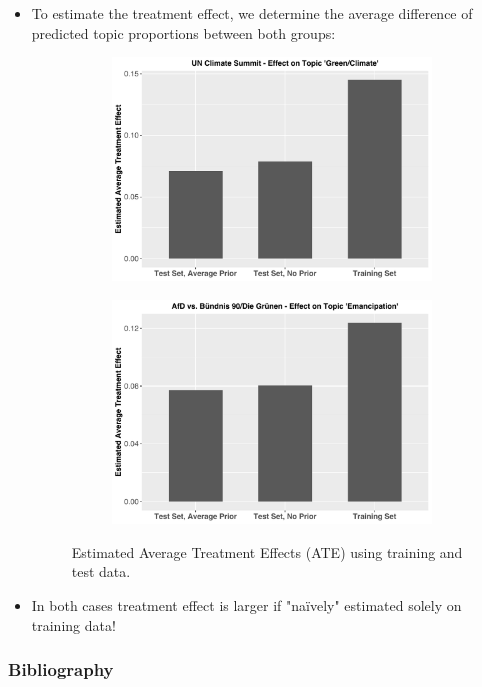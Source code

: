 \documentclass[xcolor=dvipsnames]{beamer}
\begin{document}
\begin{frame}
\begin{itemize}
\item To estimate the treatment effect, we determine the average difference of predicted topic proportions between both groups:
\begin{figure}[h!]
  \centering
  \captionsetup{justification=centering,margin=2cm}
  \begin{subfigure}[b]{0.4\linewidth}
    \includegraphics[width=\linewidth]{../../plots/presentation/climate_summit_ate.pdf}
  \end{subfigure}
  \begin{subfigure}[b]{0.4\linewidth}
    \includegraphics[width=\linewidth]{../../plots/presentation/emancipation_ate.pdf}
  \end{subfigure}
  \caption{Estimated Average Treatment Effects (ATE) using training and test data.}
  \label{fig:causal_inference_ate}
\end{figure}
\item In both cases treatment effect is larger if "na{\"i}vely" estimated solely on training data!
\end{itemize}
\end{frame}

\begin{frame}
\frametitle{Bibliography}
\printbibliography
\end{frame}
\end{document}
